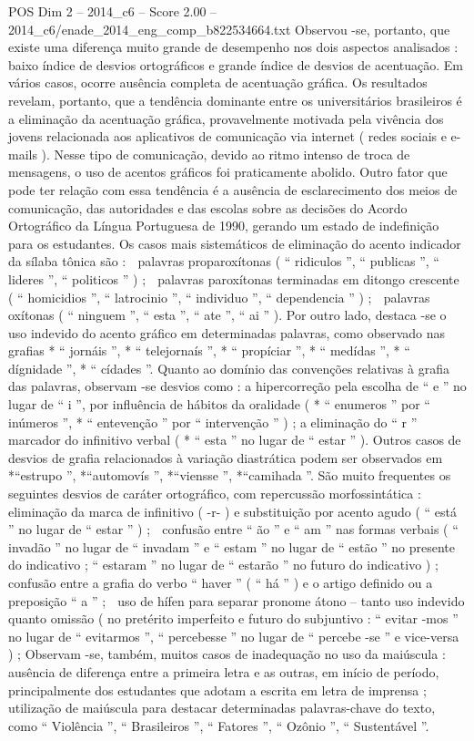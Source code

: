 \begin{textsample}{POS Dim 2 – 2014\_c6 – Score 2.00 – 2014\_c6/enade\_2014\_eng\_comp\_b822534664.txt}
Observou -se, portanto, que existe uma diferença muito grande de desempenho nos dois aspectos analisados : baixo índice de desvios ortográficos e grande índice de desvios de acentuação.
Em vários casos, ocorre ausência completa de acentuação gráfica.
Os resultados revelam, portanto, que a tendência dominante entre os universitários brasileiros é a eliminação da acentuação gráfica, provavelmente motivada pela vivência dos jovens relacionada aos aplicativos de comunicação via internet ( redes sociais e e-mails ).
Nesse tipo de comunicação, devido ao ritmo intenso de troca de mensagens, o uso de acentos gráficos foi praticamente abolido.
Outro fator que pode ter relação com essa tendência é a ausência de esclarecimento dos meios de comunicação, das autoridades e das escolas sobre as decisões do Acordo Ortográfico da Língua Portuguesa de 1990, gerando um estado de indefinição para os estudantes.
Os casos mais sistemáticos de eliminação do acento indicador da sílaba tônica são :  palavras proparoxítonas ( “ ridiculos ”, “ publicas ”, “ lideres ”, “ politicos ” ) ;  palavras paroxítonas terminadas em ditongo crescente ( “ homicidios ”, “ latrocinio ”, “ individuo ”, “ dependencia ” ) ;  palavras oxítonas ( “ ninguem ”, “ esta ”, “ ate ”, “ ai ” ).
Por outro lado, destaca -se o uso indevido do acento gráfico em determinadas palavras, como observado nas grafias * “ jornáis ”, * “ telejornaís ”, * “ propíciar ”, * “ medídas ”, * “ dígnidade ”, * “ cídades ”.
Quanto ao domínio das convenções relativas à grafia das palavras, observam -se desvios como : a hipercorreção pela escolha de “ e ” no lugar de “ i ”, por influência de hábitos da oralidade ( * “ enumeros ” por “ inúmeros ”, * “ entevenção ” por “ intervenção ” ) ; a eliminação do “ r ” marcador do infinitivo verbal ( * “ esta ” no lugar de “ estar ” ).
Outros casos de desvios de grafia relacionados à variação diastrática podem ser observados em *“estrupo ”, *“automovís ”, *“viensse ”, *“camihada ”.
São muito frequentes os seguintes desvios de caráter ortográfico, com repercussão morfossintática :  eliminação da marca de infinitivo ( -r- ) e substituição por acento agudo ( “ está ” no lugar de “ estar ” ) ;  confusão entre “ ão ” e “ am ” nas formas verbais ( “ invadão ” no lugar de “ invadam ” e “ estam ” no lugar de “ estão ” no presente do indicativo ; “ estaram ” no lugar de “ estarão ” no futuro do indicativo ) ;  confusão entre a grafia do verbo “ haver ” ( “ há ” ) e o artigo definido ou a preposição “ a ” ;  uso de hífen para separar pronome átono – tanto uso indevido quanto omissão ( no pretérito imperfeito e futuro do subjuntivo : “ evitar -mos ” no lugar de “ evitarmos ”, “ percebesse ” no lugar de “ percebe -se ” e vice-versa ) ; Observam -se, também, muitos casos de inadequação no uso da maiúscula : ausência de diferença entre a primeira letra e as outras, em início de período, principalmente dos estudantes que adotam a escrita em letra de imprensa ; utilização de maiúscula para destacar determinadas palavras-chave do texto, como “ Violência ”, “ Brasileiros ”, “ Fatores ”, “ Ozônio ”, “ Sustentável ”.

\end{textsample}

